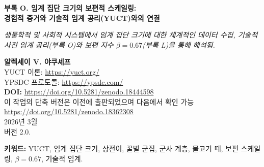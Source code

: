 \documentclass[12pt]{article}
\theoremstyle{remark}
\begin{document}
	
	\begin{titlepage}
		\begin{center}
			\vspace*{0.5cm}
			\Huge\textbf{부록 O. 임계 집단 크기의 보편적 스케일링: \\ 경험적 증거와 기술적 임계 공리(YUCT)와의 연결}
			
			\vspace{0.3cm}
			\small\textit{생물학적 및 사회적 시스템에서 임계 집단 크기에 대한 체계적인 데이터 수집, 기술적 사전 임계 공리(부록 O)와 보편 지수 \(\beta = 0.67\)(부록 L)을 통해 해석됨.}
			
			\vspace{0.3cm}
			\small\textbf{알렉세이 V. 야쿠셰프} \\
			YUCT 이론: \url{https://yuct.org/}\\
			YPSDC 프로토콜: \url{https://ypsdc.com/}\\
			
			\vspace{2cm}
			\textbf{DOI:} \url{https://doi.org/10.5281/zenodo.18444598}\\
			
			\vspace{1cm}
			\large 
			이 작업의 단축 버전은 이전에 출판되었으며 다음에서 확인 가능\\
			\url{https://doi.org/10.5281/zenodo.18362308}\\
			\vspace{1cm}
			2026년 3월 \\ \large 버전 2.0.
			
			\vspace{0.5cm}
			\begin{minipage}{0.95\textwidth}
				\begin{abstract}
					\noindent
					이 부록은 다양한 집단 시스템이 군집, 분열 또는 구조 재편성과 같은 상전이를 겪는 임계 크기에 대한 경험적 데이터를 수집합니다. 조사된 시스템에는 꿀벌 군집, 군사 부대, 물고기 떼, 돌고래 무리, 가축 개체군 및 영장류 집단이 포함됩니다. 보편 오차 스케일링 법칙 \(\varepsilon \propto N^{\beta}\) (\(\beta = 0.67\), 부록 L)과 기술적 사전 임계 공리(부록 O)를 사용하여, 전이가 발생하는 임계 크기 \(N_{\text{crit}}\)와 최적 집단 크기 \(N_{\text{opt}}\) 사이의 정량적 관계를 유도합니다. 다양한 시스템에 대해 관찰된 비율 \(N_{\text{crit}}/N_{\text{opt}}\)은 \(\beta = 0.67\)과 일치하는 값 주변에 모여 있으며, 이는 이 지수의 보편성과 기술적(또는 조직적) 임계를 넘는 것이 조정 효율성의 상전이에 해당한다는 아이디어에 대한 독립적 지지를 제공합니다. 또한 YUCT 프레임워크를 더욱 검증할 수 있는 미래 실험 및 현장 연구를 위한 구체적이고 테스트 가능한 예측을 제안합니다.
				\end{abstract}
			\end{minipage}
			
			\vspace{0.3cm}
			\noindent
			\small\textbf{키워드:} YUCT, 임계 집단 크기, 상전이, 꿀벌 군집, 군사 계층, 물고기 떼, 보편 스케일링, \(\beta = 0.67\), 기술적 임계.
		\end{center}
	\end{titlepage}
	
\end{document}
